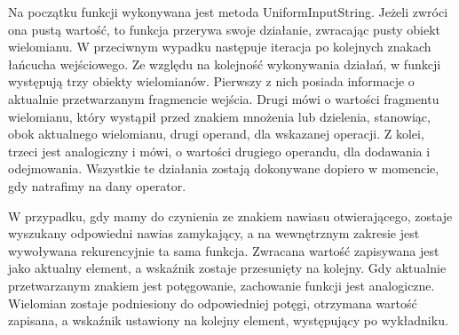 \documentclass[twoside,a4paper]{book}
\begin{document}
Na początku funkcji wykonywana jest metoda UniformInputString. Jeżeli zwróci ona pustą wartość, to funkcja przerywa swoje działanie, zwracając pusty obiekt wielomianu. W przeciwnym wypadku następuje iteracja po kolejnych znakach łańcucha wejściowego. Ze względu na kolejność wykonywania działań, w funkcji występują trzy obiekty wielomianów. Pierwszy z nich posiada informacje o aktualnie przetwarzanym fragmencie wejścia. Drugi mówi o wartości fragmentu wielomianu, który wystąpił przed znakiem mnożenia lub dzielenia, stanowiąc, obok aktualnego wielomianu, drugi operand, dla wskazanej operacji. Z kolei, trzeci jest analogiczny i mówi, o wartości drugiego operandu, dla dodawania i odejmowania. Wszystkie te działania zostają dokonywane dopiero w momencie, gdy natrafimy na dany operator.

W przypadku, gdy mamy do czynienia ze znakiem nawiasu otwierającego, zostaje wyszukany odpowiedni nawias zamykający, a na wewnętrznym zakresie jest wywoływana rekurencyjnie ta sama funkcja. Zwracana wartość zapisywana jest jako aktualny element, a wskaźnik zostaje przesunięty na kolejny. Gdy aktualnie przetwarzanym znakiem jest potęgowanie, zachowanie funkcji jest analogiczne. Wielomian zostaje podniesiony do odpowiedniej potęgi, otrzymana wartość zapisana, a wskaźnik ustawiony na kolejny element, występujący po wykładniku.
\end{document}
